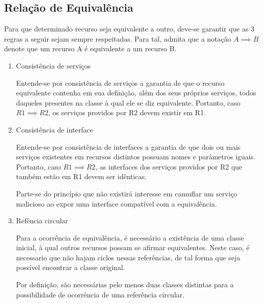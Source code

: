 \subsection{Relação de Equivalência}

Para que determinado recurso seja equivalente a outro, deve-se garantir que as 3 regras a seguir sejam sempre respeitadas. Para tal, admita que a notação $A \implies B$ denote que um recurso A é equivalente a um recurso B.

\begin{enumerate}
	\item Consistência de serviços

		Entende-se por consistência de serviços a garantia de que o recurso equivalente contenha em sua definição, além dos seus próprios serviços, todos daqueles presentes na classe à qual ele se diz equivalente. Portanto, caso $R1 \implies R2$, os serviços providos por R2 devem existir em R1.

	\item Consistência de interface

		Entende-se por consistência de interfaces a garantia de que dois ou mais serviços existentes em recursos distintos possuam nomes e parâmetros iguais. Portanto, caso $R1 \implies R2$, as interfaces dos serviços providos por R2 que também estão em R1 devem ser idênticas.

		Parte-se do princípio que não existirá interesse em camuflar um serviço malicioso ao expor uma interface compatível com a equivalência.

	\item Refência circular

		Para a ocorrência de equivalência, é necessário a existência de uma classe inicial, à qual outros recursos possam se afirmar equivalentes. Neste caso, é necessario que não hajam ciclos nessas referências, de tal forma que seja possível encontrar a classe original.

		Por definição, são necessárias pelo menos duas classes distintas para a possibilidade de ocorrência de uma referência circular.
\end{enumerate}

